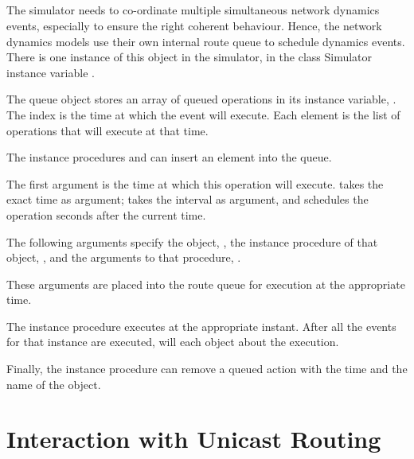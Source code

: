 \subsection{\protect{}}
\label{sec:rtqueue}

The simulator needs to co-ordinate multiple simultaneous network
dynamics events, especially to ensure the right coherent behaviour.
Hence, the network dynamics models use their own internal 
route queue to schedule dynamics events.
There is one instance of this object in the simulator, in the
class Simulator instance variable .

The queue object stores an array of queued operations
in its instance variable, .
The index is the time at which the event will execute.
Each element is the list of operations that will execute at that time.

The instance procedures
 and
can insert an element into the queue.
\begin{list}{}{}
\item The first argument is the time at which this operation will execute.
   takes the exact time as argument;
   takes the interval as argument, and schedules the
  operation  seconds after the current time.
\item The following arguments specify the object, ,
  the instance procedure of that object, ,
  and the arguments to that procedure, .

  These arguments are placed into the route queue
  for execution at the appropriate time.
\end{list}

The instance procedure
executes  at the appropriate instant.
After all the events for that instance are executed,
 will  each object about the execution.

Finally, the instance procedure
can remove a queued action with the time and the name of the object.

\section{Interaction with Unicast Routing}
\label{sec:unicast-int}

